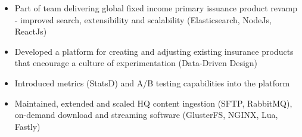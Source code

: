 \documentclass[10pt,a4paper]{altacv}
\begin{document}
\begin{itemize}
\item Part of team delivering global fixed income primary issuance product revamp - improved search, extensibility and scalability (Elasticsearch, NodeJs, ReactJs)
\end{itemize}

\divider

\begin{itemize}
\item Developed a platform for creating and adjusting existing insurance products that encourage a culture of experimentation (Data-Driven Design)
\item Introduced metrics (StatsD) and A/B testing capabilities into the platform
\end{itemize}

\divider

\begin{itemize}
\item Maintained, extended and scaled HQ content ingestion (SFTP, RabbitMQ), on-demand download and streaming software (GlusterFS, NGINX, Lua, Fastly)
\end{itemize}

\divider


\clearpage
\nocite{*}

\end{document}
